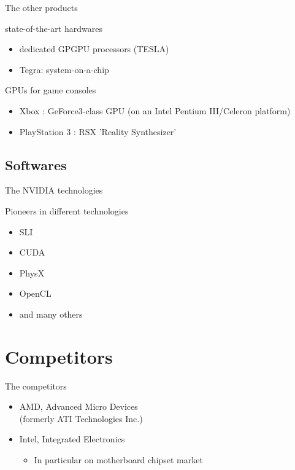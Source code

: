 \documentclass{beamer}
\begin{document}
\begin{frame}{The other products}
	\transdissolve[duration=0.1]
	\begin{block}{state-of-the-art hardwares}
		\begin{itemize}
			\item<+->{dedicated GPGPU processors (TESLA)}
			\item<+->{Tegra: system-on-a-chip}
		\end{itemize}
	\end{block}
	\pause
	\begin{block}{GPUs for game consoles}
		\begin{itemize}
			\item<+->{Xbox : GeForce3-class GPU (on an Intel Pentium III/Celeron platform)}
			\item<+->{PlayStation 3 : RSX 'Reality Synthesizer'}
		\end{itemize}
	\end{block}
\end{frame}

\subsection{Softwares}
\begin{frame}{The NVIDIA technologies}
	\transdissolve[duration=0.1]
	\begin{block}{Pioneers in different technologies}
		\begin{itemize}
			\item<+->{SLI}
			\item<+->{CUDA}
			\item<+->{PhysX}
			\item<+->{OpenCL}
			\item<+->{and many others}
		\end{itemize}
	\end{block}
\end{frame}

\section{Competitors}
\begin{frame}{The competitors}
	\transdissolve[duration=0.1]
	\begin{block}{}
		\begin{itemize}
			\item<+->{AMD, Advanced Micro Devices \\(formerly ATI Technologies Inc.)}
		\end{itemize}

		\begin{itemize}
			\item<+->{Intel, Integrated Electronics}
			\begin{itemize}
				\item<+->{In particular on motherboard chipset market}
			\end{itemize}
		\end{itemize}
	\end{block}
\end{frame}
\end{document}
